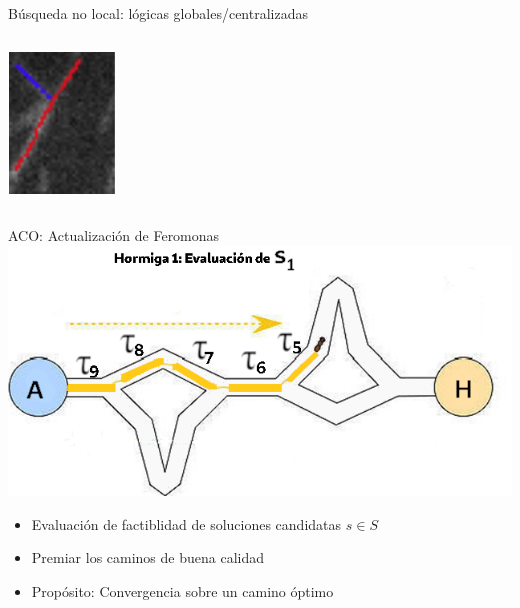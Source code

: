 \begin{frame}{B\'usqueda no local: l\'ogicas globales/centralizadas}
\begin{columns}
\begin{column}{0.2\textwidth}
        \vspace{0.5cm}
        \includegraphics[scale=0.5]{Pictures/NoConsenso4.png}
        \end{column}
    \end{columns}
\end{frame}

\begin{frame}{ACO: Actualizaci\'on de Feromonas}
\centering
\includegraphics[scale=0.4]{Pictures/ACO-ant-ferom.png}
\begin{itemize}
    \item Evaluaci\'on de factiblidad de soluciones candidatas $s \in S$
    \item Premiar los caminos de buena calidad
    \item Prop\'osito: Convergencia sobre un camino \'optimo
\end{itemize}
\end{frame}


